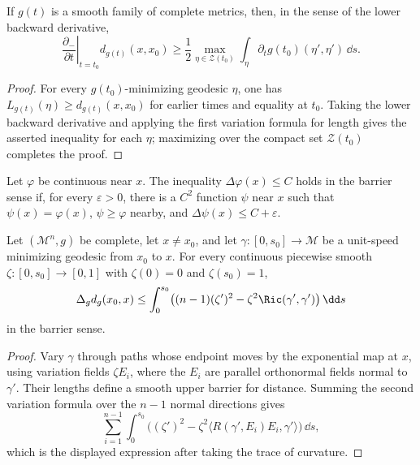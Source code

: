 \begin{lemma}
\label{lem:chow-iii-backward-distance-derivative}
If \(g(t)\) is a smooth family of complete metrics, then, in the sense of the
lower backward derivative,
\[
 \left.\frac{\partial_-}{\partial t}\right|_{t=t_0}d_{g(t)}(x,x_0)
 \ge\frac12\max_{\eta\in\mathcal Z(t_0)}
 \int_\eta\partial_tg(t_0)(\eta',\eta')\,\dd s.
\]
\end{lemma}
\begin{proof}
\sketch For every \(g(t_0)\)-minimizing geodesic \(\eta\), one has
\(L_{g(t)}(\eta)\ge d_{g(t)}(x,x_0)\) for earlier times and equality at
\(t_0\).  Taking the lower backward derivative and applying the first
variation formula for length gives the asserted inequality for each \(\eta\);
maximizing over the compact set \(\mathcal Z(t_0)\) completes the proof.
\end{proof}

\begin{definition}
\label{def:chow-iii-laplacian-upper-barrier}
Let \(\varphi\) be continuous near \(x\).  The inequality
\(\Delta\varphi(x)\le C\) holds in the barrier sense if, for every
\(\varepsilon>0\), there is a \(C^2\) function \(\psi\) near \(x\) such that
\(\psi(x)=\varphi(x)\), \(\psi\ge\varphi\) nearby, and
\(\Delta\psi(x)\le C+\varepsilon\).
\end{definition}

\begin{lemma}
\label{lem:chow-iii-distance-laplacian-upper-bound}
Let \((\mathcal M^n,g)\) be complete, let \(x\ne x_0\), and let
\(\gamma:[0,s_0]\to\mathcal M\) be a unit-speed minimizing geodesic from
\(x_0\) to \(x\).  For every continuous piecewise smooth
\(\zeta:[0,s_0]\to[0,1]\) with \(\zeta(0)=0\) and \(\zeta(s_0)=1\),
\[
 \Delta_gd_g(x_0,x)\le\int_0^{s_0}
 \bigl((n-1)(\zeta')^2-\zeta^2\Ric(\gamma',\gamma')\bigr)\,\dd s
\]
in the barrier sense.
\end{lemma}
\begin{proof}
\sketch Vary \(\gamma\) through paths whose endpoint moves by the exponential map at
\(x\), using variation fields \(\zeta E_i\), where the \(E_i\) are parallel
orthonormal fields normal to \(\gamma'\).  Their lengths define a smooth upper
barrier for distance.  Summing the second variation formula over the
\(n-1\) normal directions gives
\[
 \sum_{i=1}^{n-1}\int_0^{s_0}
 \bigl((\zeta')^2-\zeta^2\langle R(\gamma',E_i)E_i,\gamma'\rangle\bigr)\,\dd s,
\]
which is the displayed expression after taking the trace of curvature.
\end{proof}

